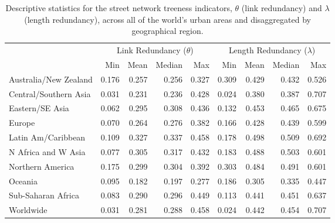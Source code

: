 \documentclass[12pt,letterpaper]{article} %
\begin{document}
\begin{table}[!tb]
  \footnotesize
  \centering
  \caption{Descriptive statistics for the street network treeness indicators, $\theta$ (link redundancy) and $\lambda$ (length redundancy), across all of the world's urban areas and disaggregated by geographical region.}\label{tab:treeness_descriptive}
  \begin{tabular}{lrrrrrrrr}
    \toprule
                          & \multicolumn{4}{c}{Link Redundancy ($\theta$)} & \multicolumn{4}{c}{Length Redundancy ($\lambda$)} \\
                          & Min                                            & Mean  & Median & Max   & Min   & Mean  & Median & Max \\
    \midrule
    Australia/New Zealand & 0.176                                          & 0.257 & 0.256  & 0.327 & 0.309 & 0.429 & 0.432  & 0.526 \\
    Central/Southern Asia & 0.031                                          & 0.231 & 0.236  & 0.428 & 0.024 & 0.380 & 0.387  & 0.707 \\
    Eastern/SE Asia       & 0.062                                          & 0.295 & 0.308  & 0.436 & 0.132 & 0.453 & 0.465  & 0.675 \\
    Europe                & 0.070                                          & 0.264 & 0.276  & 0.382 & 0.166 & 0.428 & 0.439  & 0.599 \\
    Latin Am/Caribbean    & 0.109                                          & 0.327 & 0.337  & 0.458 & 0.178 & 0.498 & 0.509  & 0.692 \\
    N Africa and W Asia   & 0.077                                          & 0.305 & 0.317  & 0.432 & 0.183 & 0.488 & 0.503  & 0.601 \\
    Northern America      & 0.175                                          & 0.299 & 0.304  & 0.392 & 0.303 & 0.484 & 0.491  & 0.601 \\
    Oceania               & 0.095                                          & 0.182 & 0.197  & 0.277 & 0.186 & 0.305 & 0.335  & 0.447 \\
    Sub-Saharan Africa    & 0.083                                          & 0.290 & 0.296  & 0.449 & 0.113 & 0.441 & 0.451  & 0.637 \\
    \midrule
    Worldwide             & 0.031                                          & 0.281 & 0.288  & 0.458 & 0.024 & 0.442 & 0.454  & 0.707 \\
    \bottomrule
  \end{tabular}
\end{table}
\end{document}
